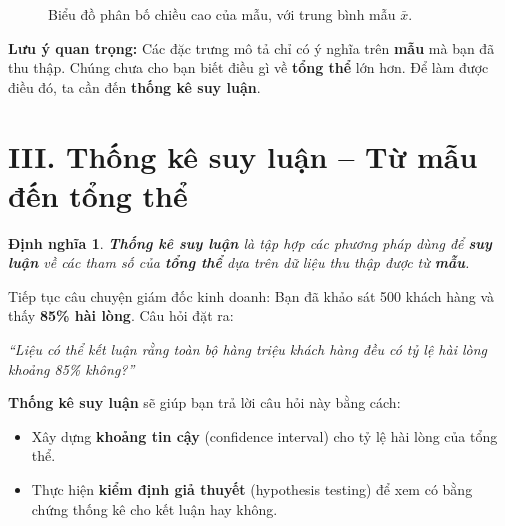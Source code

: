 \documentclass[a4paper,12pt]{article}
\newtheorem{defn}{\color{defcolor}\bfseries Định nghĩa}[section]
\theoremstyle{remark}
\begin{document}
\begin{figure}[H]
\centering
{}
\caption{Biểu đồ phân bố chiều cao của mẫu, với trung bình mẫu \(\bar{x}\).}
\end{figure}

\begin{notebox}
\textbf{Lưu ý quan trọng:} Các đặc trưng mô tả chỉ có ý nghĩa trên \textbf{mẫu} mà bạn đã thu thập. Chúng chưa cho bạn biết điều gì về \textbf{tổng thể} lớn hơn. Để làm được điều đó, ta cần đến \textbf{thống kê suy luận}.
\end{notebox}

\section*{\color{maincolor}III. Thống kê suy luận – Từ mẫu đến tổng thể}

\begin{defn}
\textbf{Thống kê suy luận} là tập hợp các phương pháp dùng để \textbf{suy luận} về các tham số của \textbf{tổng thể} dựa trên dữ liệu thu thập được từ \textbf{mẫu}.
\end{defn}

\begin{metabox}
Tiếp tục câu chuyện giám đốc kinh doanh: Bạn đã khảo sát 500 khách hàng và thấy \textbf{85\% hài lòng}. Câu hỏi đặt ra:

\vspace{0.3cm}
\textit{“Liệu có thể kết luận rằng toàn bộ hàng triệu khách hàng đều có tỷ lệ hài lòng khoảng 85\% không?”}

\vspace{0.3cm}
\textbf{Thống kê suy luận} sẽ giúp bạn trả lời câu hỏi này bằng cách:
\begin{itemize}
    \item Xây dựng \textbf{khoảng tin cậy} (confidence interval) cho tỷ lệ hài lòng của tổng thể.
    \item Thực hiện \textbf{kiểm định giả thuyết} (hypothesis testing) để xem có bằng chứng thống kê cho kết luận hay không.
\end{itemize}
\end{metabox}
\end{document}
